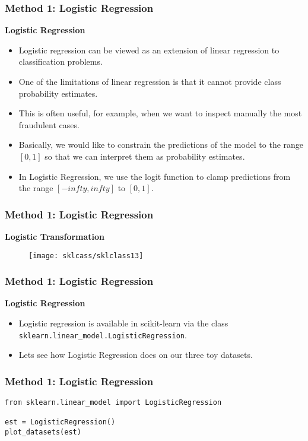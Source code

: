 \documentclass[MASTER.tex]{subfiles}
\begin{document}
\begin{frame}
		\frametitle{Method 1: Logistic Regression}
\textbf{Logistic Regression}
\begin{itemize}
\item Logistic regression can be viewed as an extension of linear regression to classification problems. \item One of the limitations of linear regression is that it cannot provide class probability estimates. 
\item This is often useful, for example, when we want to inspect manually the most fraudulent cases. 
\item Basically, we would like to constrain the predictions of the model to the range $[0,1]$ so that we can interpret them as probability estimates. 
\item In Logistic Regression, we use the logit function to clamp predictions from the range $[−infty,infty]$ to $[0,1]$. 
\end{itemize}

\end{frame}
\begin{frame}
		\frametitle{Method 1: Logistic Regression}
	\textbf{Logistic Transformation}
	\begin{figure}
\centering
\texttt{[image: sklcass/sklclass13]}

\end{figure}

\end{frame}
\begin{frame}
		\frametitle{Method 1: Logistic Regression}
	\Large
	\textbf{Logistic Regression}
\begin{itemize}
\item Logistic regression is available in scikit-learn via the class \texttt{sklearn.linear\_model.LogisticRegression}. 
\item Lets see how Logistic Regression does on our three toy datasets.
\end{itemize}

\end{frame}


\begin{frame}[fragile]
		\frametitle{Method 1: Logistic Regression}
	\begin{framed}
		\begin{verbatim}
from sklearn.linear_model import LogisticRegression

est = LogisticRegression()
plot_datasets(est)
	\end{verbatim}
\end{framed}
\end{frame}
\end{document}
